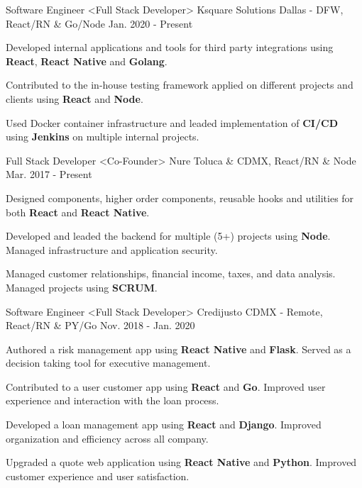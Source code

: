 \begin{cventries}
  \cventry
    {Software Engineer <Full Stack Developer>}
    {Ksquare Solutions}
    {Dallas - DFW, React/RN \& Go/Node}
    {Jan. 2020 - Present}
    {
      \begin{cvitems}
        \item {Developed internal applications and tools for third party integrations using \textbf{React}, \textbf{React Native} and \textbf{Golang}.}
        \item {Contributed to the in-house testing framework applied on different projects and clients using \textbf{React} and \textbf{Node}.}
        \item {Used Docker container infrastructure and leaded implementation of \textbf{CI/CD} using \textbf{Jenkins} on multiple internal projects.}
      \end{cvitems}
    }
  \cventry
    {Full Stack Developer <Co-Founder>}
    {Nure}
    {Toluca \& CDMX, React/RN \& Node}
    {Mar. 2017 - Present}
    {
      \begin{cvitems}
        \item {Designed components, higher order components, reusable hooks and utilities for both \textbf{React} and \textbf{React Native}.}
        \item {Developed and leaded the backend for multiple (5+) projects using \textbf{Node}. Managed infrastructure and application security.}
         \item {Managed customer relationships, financial income, taxes, and data analysis. Managed projects using \textbf{SCRUM}.}
      \end{cvitems}
    }
  \cventry
    {Software Engineer <Full Stack Developer>}
    {Credijusto}
    {CDMX - Remote, React/RN \& PY/Go}
    {Nov. 2018 - Jan. 2020}
    {
      \begin{cvitems}
        \item {Authored a risk management app using \textbf{React Native} and \textbf{Flask}. Served as a decision taking tool for executive management.}
        \item {Contributed to a user customer app using \textbf{React} and \textbf{Go}. Improved user experience and interaction with the loan process.}
        \item {Developed a loan management app using \textbf{React} and \textbf{Django}. Improved organization and efficiency across all company.}
        \item {Upgraded a quote web application using \textbf{React Native} and \textbf{Python}. Improved customer experience and user satisfaction.}

\end{cvitems}}
\end{cventries}
